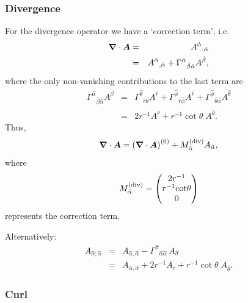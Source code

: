 \documentclass[\mydriver,12pt,twoside,notitlepage,a4paper]{article}
\renewcommand{\vec}[1]{\mbox{\boldmath{$#1$}}}
\newcommand{\Av}            {\vec{A}}
\newcommand{\nab}{\mbox{\boldmath $\nabla$} {}}
\begin{document}
\subsubsection{Divergence}

For the divergence operator we have a `correction term', i.e.\
\begin{eqnarray}
\nab\cdot\Av&=&{A^{\hat\alpha}}_{;{\hat\alpha}}
\\
             &=&{A^{\hat\alpha}}_{,{\hat\alpha}}
+{\Gamma^{\hat\alpha}}_{{\hat\beta}{\hat\alpha}}A^{\hat\beta},
\end{eqnarray}
where the only non-vanishing contributions to
the last term are
\begin{eqnarray}
{\Gamma^{\hat\alpha}}_{{\hat\beta}{\hat\alpha}}A^{\hat\beta}
&=&{\Gamma^{\hat\theta}}_{{\hat r}{\hat\theta}}A^{\hat r}
+{\Gamma^{\hat\phi}}_{{\hat r}{\hat\phi}}A^{\hat r}
+{\Gamma^{\hat\phi}}_{{\hat\theta}{\hat\phi}}A^{\hat\theta}
\\
&=&2r^{-1}A^{\hat r}+r^{-1}\!\cot\!\theta\; A^{\hat\theta}.
\end{eqnarray}
Thus,
\begin{equation}
\nab\cdot\Av=\left(\nab\cdot\Av\right)^{(0)}
+M^{\rm(div)}_{\hat\alpha}A_{\hat\alpha},
\end{equation}
where
\begin{equation}
M^{\rm(div)}_{\hat\alpha}=
\begin{pmatrix}
2r^{-1}\cr r^{-1}\!\cot\!\theta\cr 0\cr
\end{pmatrix}
\end{equation}
represents the correction term.

Alternatively:
\begin{eqnarray}
A_{\hat\alpha;\hat\alpha}&=&A_{\hat\alpha,\hat\alpha}
-{\Gamma^{\hat\sigma}}_{\hat\alpha\hat\alpha}\,A_{\hat\sigma}
\\
&=&A_{\hat\alpha,\hat\alpha}
+2r^{-1}A_{\hat r}+r^{-1}\!\cot\!\theta\; A_{\hat\theta}.
\end{eqnarray}

\subsubsection{Curl}
\end{document}
